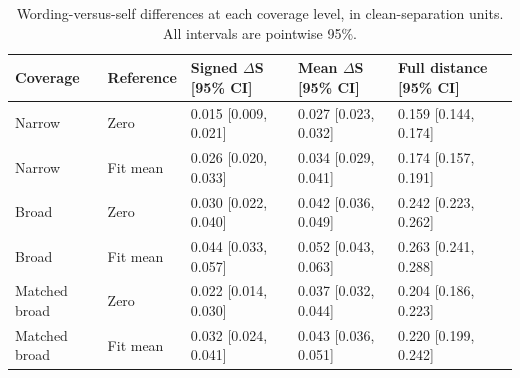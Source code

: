 \begin{table}[htbp]
\centering\footnotesize
\setlength{\tabcolsep}{3pt}
\caption{Wording-versus-self differences at each coverage level, in clean-separation units. All intervals are pointwise 95\%.}
\label{tab:b008-differences}
\begin{tabular}{@{}lllll@{}}
\toprule
Coverage & Reference & Signed \(\Delta\)S [95\% CI] & Mean \textbar{}\(\Delta\)S\textbar{} [95\% CI] & Full distance [95\% CI] \\
\midrule
Narrow & Zero & 0.015 [0.009, 0.021] & 0.027 [0.023, 0.032] & 0.159 [0.144, 0.174] \\
Narrow & Fit mean & 0.026 [0.020, 0.033] & 0.034 [0.029, 0.041] & 0.174 [0.157, 0.191] \\
Broad & Zero & 0.030 [0.022, 0.040] & 0.042 [0.036, 0.049] & 0.242 [0.223, 0.262] \\
Broad & Fit mean & 0.044 [0.033, 0.057] & 0.052 [0.043, 0.063] & 0.263 [0.241, 0.288] \\
Matched broad & Zero & 0.022 [0.014, 0.030] & 0.037 [0.032, 0.044] & 0.204 [0.186, 0.223] \\
Matched broad & Fit mean & 0.032 [0.024, 0.041] & 0.043 [0.036, 0.051] & 0.220 [0.199, 0.242] \\
\bottomrule
\end{tabular}
\end{table}

